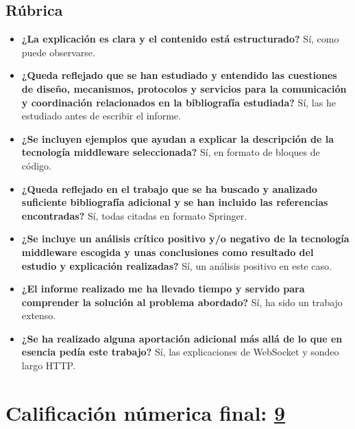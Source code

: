 \documentclass[runningheads]{llncs}
\begin{document}
\subsection*{Rúbrica}

\begin{itemize}
	\item
		\textbf{¿La explicación es clara y el contenido está estructurado?}
		Sí, como puede observarse.
	\item
		\textbf{¿Queda reflejado que se han estudiado y entendido las cuestiones de diseño, mecanismos, protocolos y servicios para la comunicación y coordinación relacionados en la bibliografía estudiada?}
		Sí, las he estudiado antes de escribir el informe.
	\item
		\textbf{¿Se incluyen ejemplos que ayudan a explicar la descripción de la tecnología middleware seleccionada?}
		Sí, en formato de bloques de código.
	\item
		\textbf{¿Queda reflejado en el trabajo que se ha buscado y analizado suficiente bibliografía adicional y se han incluido las referencias encontradas?}
		Sí, todas citadas en formato Springer.
	\item
		\textbf{¿Se incluye un análisis crítico positivo y/o negativo de la tecnología middleware escogida y unas conclusiones como resultado del estudio y explicación realizadas?}
		Sí, un análisis positivo en este caso.
	\item
		\textbf{¿El informe realizado me ha llevado tiempo y servido para comprender la solución al problema abordado?}
		Sí, ha sido un trabajo extenso.
	\item
		\textbf{¿Se ha realizado alguna aportación adicional más allá de lo que en esencia pedía este trabajo?}
		Sí, las explicaciones de WebSocket y sondeo largo HTTP\@.
\end{itemize}

\section*{Calificación númerica final: \underline{9}}
\end{document}
